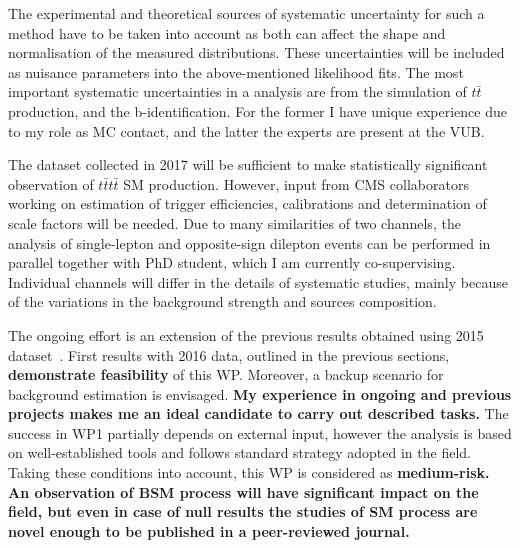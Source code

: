 The experimental and theoretical sources of systematic uncertainty for such a method have to be taken into account as both can affect the shape and normalisation of the measured distributions. These uncertainties will be included as nuisance parameters into the above-mentioned likelihood fits.
The most important systematic uncertainties in a \fourtop analysis are from the simulation of $t\bar{t}$ production, and the b-identification. For the former I have unique experience due to my role as MC contact, and the latter the experts are present at the VUB. 

\textcolor{\mycolor}{
The dataset collected in 2017 will be sufficient to make statistically significant observation of $t\bar{t}t\bar{t}$ SM production. However, input from CMS collaborators working on estimation of trigger efficiencies, calibrations and determination of scale factors will be needed. Due to many similarities of two channels, the analysis of single-lepton and opposite-sign dilepton events can be performed in parallel together with PhD student, which I am currently co-supervising. Individual channels will differ in the details of systematic studies, mainly because of the variations in the background strength and sources composition. 
}

\textcolor{\mycolor}{
The ongoing effort is an extension of the previous results obtained using 2015 dataset~\cite{Sirunyan:2017tep}. First results with 2016 data, outlined in the previous sections, \textbf{demonstrate feasibility} of this WP. Moreover, a backup scenario for background estimation is envisaged. \textbf{My experience in ongoing and previous projects makes me an ideal candidate to carry out described tasks.}
The success in WP1 partially depends on external input, however the analysis is based on well-established tools and follows standard strategy adopted in the field. Taking these conditions into account, this WP is considered as \textbf{medium-risk.} \textbf{An observation of BSM process will have significant impact on the field, but even in case of null results the studies of SM \tttt process are novel enough to be published in a peer-reviewed journal.}
}
